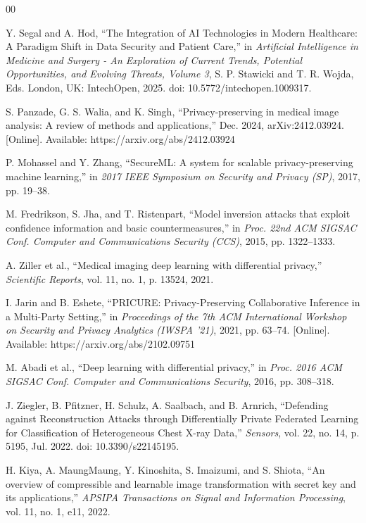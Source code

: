 \documentclass[conference]{IEEEtran}
\begin{document}
\begin{thebibliography}{00}

 Y. Segal and A. Hod, ``The Integration of AI Technologies in Modern Healthcare: A Paradigm Shift in Data Security and Patient Care,'' in \textit{Artificial Intelligence in Medicine and Surgery - An Exploration of Current Trends, Potential Opportunities, and Evolving Threats, Volume 3}, S. P. Stawicki and T. R. Wojda, Eds. London, UK: IntechOpen, 2025. doi: 10.5772/intechopen.1009317.

 S. Panzade, G. S. Walia, and K. Singh, ``Privacy-preserving in medical image analysis: A review of methods and applications,'' Dec. 2024, arXiv:2412.03924. [Online]. Available: https://arxiv.org/abs/2412.03924

 P. Mohassel and Y. Zhang, ``SecureML: A system for scalable privacy-preserving machine learning,'' in \textit{2017 IEEE Symposium on Security and Privacy (SP)}, 2017, pp. 19--38.

 M. Fredrikson, S. Jha, and T. Ristenpart, ``Model inversion attacks that exploit confidence information and basic countermeasures,'' in \textit{Proc. 22nd ACM SIGSAC Conf. Computer and Communications Security (CCS)}, 2015, pp. 1322--1333.

 A. Ziller et al., ``Medical imaging deep learning with differential privacy,'' \textit{Scientific Reports}, vol. 11, no. 1, p. 13524, 2021.

 I. Jarin and B. Eshete, ``PRICURE: Privacy-Preserving Collaborative Inference in a Multi-Party Setting,'' in \textit{Proceedings of the 7th ACM International Workshop on Security and Privacy Analytics (IWSPA '21)}, 2021, pp. 63--74. [Online]. Available: https://arxiv.org/abs/2102.09751

 M. Abadi et al., ``Deep learning with differential privacy,'' in \textit{Proc. 2016 ACM SIGSAC Conf. Computer and Communications Security}, 2016, pp. 308--318.

 J. Ziegler, B. Pfitzner, H. Schulz, A. Saalbach, and B. Arnrich, ``Defending against Reconstruction Attacks through Differentially Private Federated Learning for Classification of Heterogeneous Chest X-ray Data,'' \textit{Sensors}, vol. 22, no. 14, p. 5195, Jul. 2022. doi: 10.3390/s22145195.

 H. Kiya, A. MaungMaung, Y. Kinoshita, S. Imaizumi, and S. Shiota, ``An overview of compressible and learnable image transformation with secret key and its applications,'' \textit{APSIPA Transactions on Signal and Information Processing}, vol. 11, no. 1, e11, 2022.


\end{thebibliography}
\end{document}

